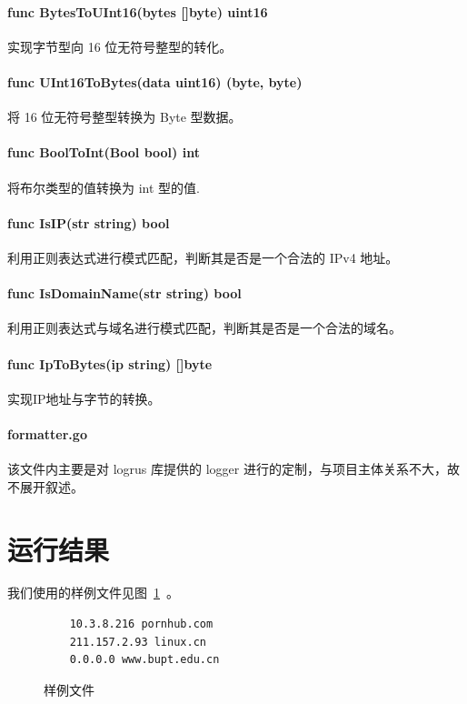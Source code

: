 \documentclass[blue,normal,cn]{elegantnote}
\begin{document}
\paragraph{func BytesToUInt16(bytes []byte) uint16} 实现字节型向 16 位无符号整型的转化。

\paragraph{func UInt16ToBytes(data uint16) (byte, byte)} 将 16 位无符号整型转换为 Byte 型数据。

\paragraph{func BoolToInt(Bool bool) int} 将布尔类型的值转换为 int 型的值.

\paragraph{func IsIP(str string) bool} 利用正则表达式进行模式匹配，判断其是否是一个合法的 IPv4 地址。

\paragraph{func IsDomainName(str string) bool} 利用正则表达式与域名进行模式匹配，判断其是否是一个合法的域名。

\paragraph{func IpToBytes(ip string) []byte} 实现IP地址与字节的转换。

\paragraph{formatter.go} 该文件内主要是对 logrus 库提供的 logger 进行的定制，与项目主体关系不大，故不展开叙述。
\newpage

\section{运行结果}
我们使用的样例文件见图~\ref{test_example}~。
\begin{figure}[!htbp]
	\begin{lstlisting}
	10.3.8.216 pornhub.com
	211.157.2.93 linux.cn
	0.0.0.0 www.bupt.edu.cn
	\end{lstlisting}
	\caption{\label{test_example} 样例文件}
\end{figure}
\end{document}
